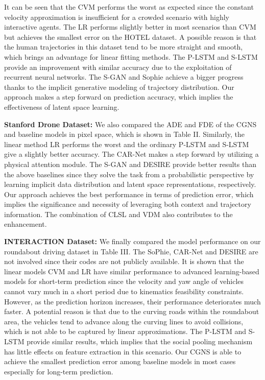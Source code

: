 \documentclass[letterpaper, 10 pt, conference]{ieeeconf}
\begin{document}
It can be seen that the CVM performs the worst as expected since the constant velocity approximation is insufficient for a crowded scenario with highly interactive agents.
The LR performs slightly better in most scenarios than CVM but achieves the smallest error on the HOTEL dataset. A possible reason is that the human trajectories in this dataset tend to be more straight and smooth, which brings an advantage for linear fitting methods.
The P-LSTM and S-LSTM provide an improvement with similar accuracy due to the exploitation of recurrent neural networks.
The S-GAN and Sophie achieve a bigger progress thanks to the implicit generative modeling of trajectory distribution.
Our approach makes a step forward on prediction accuracy, which implies the effectiveness of latent space learning.

\vspace{0.1cm}
\textbf{Stanford Drone Dataset:}  
We also compared the ADE and FDE of the CGNS and baseline models in pixel space, which is shown in Table II.
Similarly, the linear method LR performs the worst and the ordinary P-LSTM and S-LSTM give a slightly better accuracy.
The CAR-Net makes a step forward by utilizing a physical attention module.
The S-GAN and DESIRE provide better results than the above baselines since they solve the task from a probabilistic perspective by learning implicit data distribution and latent space representations, respectively. 
Our approach achieves the best performance in terms of prediction error, which implies the significance and necessity of leveraging both context and trajectory information.
The combination of CLSL and VDM also contributes to the enhancement.

\vspace{0.1cm}
\textbf{INTERACTION Dataset:}
We finally compared the model performance on our roundabout driving dataset in Table III. The SoPhie, CAR-Net and DESIRE are not involved since their codes are not publicly available.
It is shown that the linear models CVM and LR have similar performance to advanced learning-based models for short-term prediction since the velocity and yaw angle of vehicles cannot vary much in a short period due to kinematics feasibility constraints. However, as the prediction horizon increases, their performance deteriorates much faster. 
A potential reason is that due to the curving roads within the roundabout area, the vehicles tend to advance along the curving lines to avoid collisions, which is not able to be captured by linear approximations.
The P-LSTM and S-LSTM provide similar results, which implies that the social pooling mechanism has little effects on feature extraction in this scenario.
Our CGNS is able to achieve the smallest prediction error among baseline models in most cases especially for long-term prediction.
\end{document}
